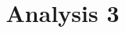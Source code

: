 \documentclass[a4paper,12pt]{article}
\title{Analysis 3}
\date{}
\begin{document}
\setcounter{figure}{1}
\maketitle
\graphicspath{{./figures}}



%
\end{document}

